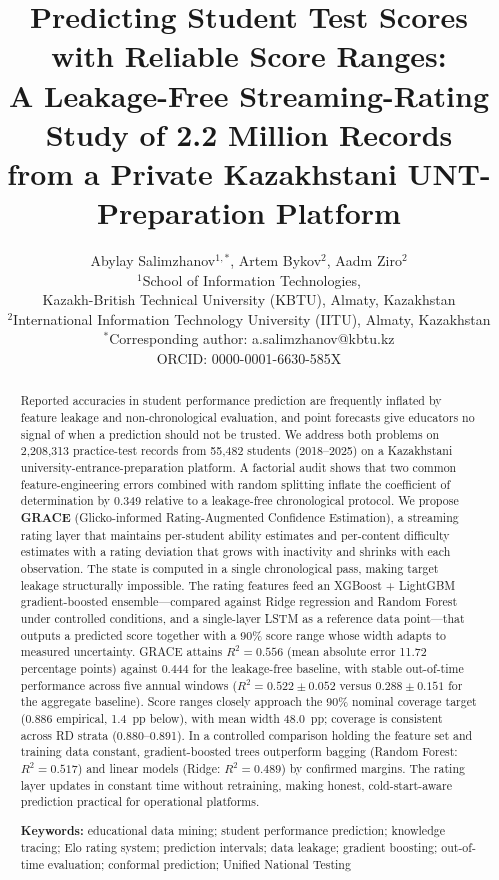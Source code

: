 \documentclass[11pt]{article}
\title{Predicting Student Test Scores with Reliable Score Ranges:\\
A Leakage-Free Streaming-Rating Study of 2.2 Million Records\\
from a Private Kazakhstani UNT-Preparation Platform}
\author{Abylay Salimzhanov$^{1,*}$, Artem Bykov$^{2}$, Aadm Ziro$^{2}$\\[4pt]
$^{1}$School of Information Technologies,\\
Kazakh-British Technical University (KBTU), Almaty, Kazakhstan\\
$^{2}$International Information Technology University (IITU), Almaty, Kazakhstan\\[4pt]
$^{*}$Corresponding author: a.salimzhanov@kbtu.kz\\
ORCID: 0000-0001-6630-585X}
\date{}
\begin{document}
\maketitle

\begin{abstract}
Reported accuracies in student performance prediction are frequently inflated by feature
leakage and non-chronological evaluation, and point forecasts give educators no signal of
when a prediction should not be trusted.
We address both problems on 2,208,313 practice-test records from 55,482 students
(2018--2025) on a Kazakhstani university-entrance-preparation platform.
A factorial audit shows that two common feature-engineering errors combined with random
splitting inflate the coefficient of determination by 0.349 relative to a leakage-free
chronological protocol.
We propose \textbf{GRACE} (Glicko-informed Rating-Augmented Confidence Estimation),
a streaming rating layer that maintains per-student ability estimates and per-content
difficulty estimates with a rating deviation that grows with inactivity and shrinks with
each observation.
The state is computed in a single chronological pass, making target leakage structurally
impossible.
The rating features feed an XGBoost + LightGBM gradient-boosted ensemble---compared
against Ridge regression and Random Forest under controlled conditions, and a single-layer
LSTM as a reference data point---that outputs a predicted score together with a 90\% score
range whose width adapts to measured uncertainty.
GRACE attains $R^{2} = 0.556$ (mean absolute error 11.72 percentage points) against
0.444 for the leakage-free baseline, with stable out-of-time performance across five
annual windows ($R^{2} = 0.522 \pm 0.052$ versus $0.288 \pm 0.151$ for the aggregate baseline).
Score ranges closely approach the 90\% nominal coverage target (0.886 empirical, 1.4~pp below),
with mean width 48.0~pp; coverage is consistent across RD strata (0.880--0.891).
In a controlled comparison holding the feature set and training data constant,
gradient-boosted trees outperform bagging (Random Forest: $R^{2}=0.517$) and
linear models (Ridge: $R^{2}=0.489$) by confirmed margins.
The rating layer updates in constant time without retraining, making honest,
cold-start-aware prediction practical for operational platforms.

\medskip\noindent
\textbf{Keywords:} educational data mining; student performance prediction;
knowledge tracing; Elo rating system; prediction intervals; data leakage;
gradient boosting; out-of-time evaluation; conformal prediction;
Unified National Testing
\end{abstract}
\end{document}
